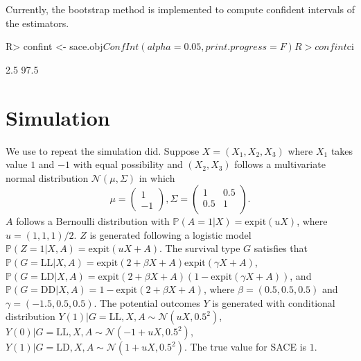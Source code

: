 \documentclass[article]{jss}
\def\expit{\mathrm{expit}}
\begin{document}
Currently, the bootstrap method is implemented to compute confident intervals of the estimators.

\begin{CodeChunk}
  \begin{CodeInput}
R> confint <- sace.obj$ConfInt(alpha = 0.05, print.progress = F)
R> confint$ci
  \end{CodeInput}
  \begin{CodeOutput}
           [,1]      [,2]      [,3]
2.5%
97.5%
  \end{CodeOutput}
\end{CodeChunk}




\section{Simulation} \label{sec:Simulation}

We use  to repeat the simulation \cite{Wang2017Identification} did. Suppose $X = (X_1,X_2,X_3)$ where $X_1$ takes value $1$ and $-1$ with equal possibility and $(X_2,X_3)$ follows a multivariate normal distribution $\mathcal{N}(\mu,\Sigma)$ in which
$$\mu = \left(
\begin{array}{c}
  1 \\ -1
\end{array}  
\right),\Sigma = 
\left(
\begin{array}{cc}
  1 & 0.5 \\
  0.5 & 1 \\
\end{array}  
\right).$$
$A$ follows a Bernoulli distribution with $\mathbb{P}(A=1|X)=\expit(uX)$, where $u=(1,1,1)/2$. $Z$ is generated following a logistic model $\mathbb{P}(Z=1|X,A)=\expit(uX+A)$. The survival type $G$ satisfies that $\mathbb{P}(G=\text{LL}|X,A)=\expit(2+\beta X+A)\expit(\gamma X+A)$, $\mathbb{P}(G=\text{LD}|X,A)=\expit(2+\beta X+A)(1-\expit(\gamma X+A))$, and $\mathbb{P}(G=\text{DD}|X,A)=1-\expit(2+\beta X+A)$, where $\beta = (0.5,0.5,0.5)$ and $\gamma = (-1.5,0.5,0.5)$. The potential outcomes $Y$ is generated with conditional distribution $Y(1)|G=\text{LL},X,A\sim\mathcal{N}(uX,0.5^2)$, $Y(0)|G=\text{LL},X,A\sim\mathcal{N}(-1+uX,0.5^2)$, $Y(1)|G=\text{LD},X,A\sim\mathcal{N}(1+uX,0.5^2)$. The true value for SACE is $1$.
\end{document}
